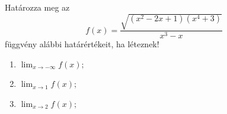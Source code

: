 \documentclass[11pt]{scrartcl}
\begin{document}
Határozza meg az
\[
	f(x) = \frac{\sqrt{(x^2 - 2x + 1)(x^4 + 3)}}{x^3 - x}
\]
függvény alábbi határértékeit, ha léteznek!
\begin{enumerate}
	\item \(\displaystyle \lim_{x \to -\infty} f(x);\)

	\item \(\displaystyle \lim_{x \to 1} f(x);\)

	\item \(\displaystyle \lim_{x \to 2} f(x);\)
\end{enumerate}
\end{document}
